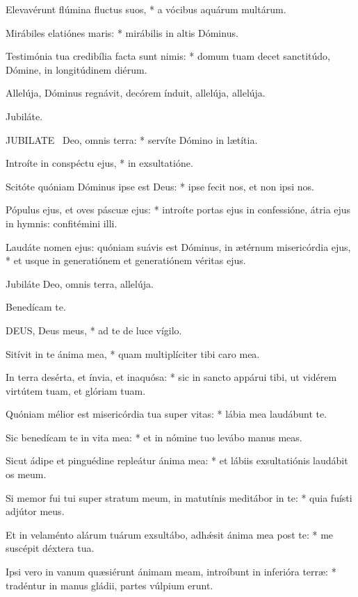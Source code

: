 Elevavérunt flúmina fluctus suos, * a vócibus aquárum multárum.

Mirábiles elatiónes maris: * mirábilis in altis Dóminus.

Testimónia tua credibília facta sunt nimis: * domum tuam decet sanctitúdo, Dómine, in longitúdinem diérum.

 Allelúja, Dóminus regnávit, decórem índuit, allelúja, allelúja.

 Jubiláte. \textdagger


\lettrine[lines=2]{J}{UBILATE} \textdagger\ Deo, omnis terra: * servíte Dómino in lætítia.

Introíte in conspéctu ejus, * in exsultatióne.

Scitóte quóniam Dóminus ipse est Deus: * ipse fecit nos, et non ipsi nos.

Pópulus ejus, et oves páscuæ ejus: * introíte portas ejus in confessióne, átria ejus in hymnis: confitémini illi.

Laudáte nomen ejus: quóniam suávis est Dóminus, in ætérnum misericórdia ejus, * et usque in generatiónem et generatiónem véritas ejus.

 Jubiláte Deo, omnis terra, allelúja.

 Benedícam te.


\lettrine[lines=2]{D}{EUS}, Deus meus, * ad te de luce vígilo.

Sitívit in te ánima mea, * quam multiplíciter tibi caro mea.

In terra desérta, et ínvia, et inaquósa: * sic in sancto appárui tibi, ut vidérem virtútem tuam, et glóriam tuam.

Quóniam mélior est misericórdia tua super vitas: * lábia mea laudábunt te.

Sic benedícam te in vita mea: * et in nómine tuo levábo manus meas.

Sicut ádipe et pinguédine repleátur ánima mea: * et lábiis exsultatiónis laudábit os meum.

Si memor fui tui super stratum meum, in matutínis meditábor in te: * quia fuísti adjútor meus.

Et in velaménto alárum tuárum exsultábo, adhǽsit ánima mea post te: * me suscépit déxtera tua.

Ipsi vero in vanum quæsiérunt ánimam meam, introíbunt in inferióra terræ: * tradéntur in manus gládii, partes vúlpium erunt.

